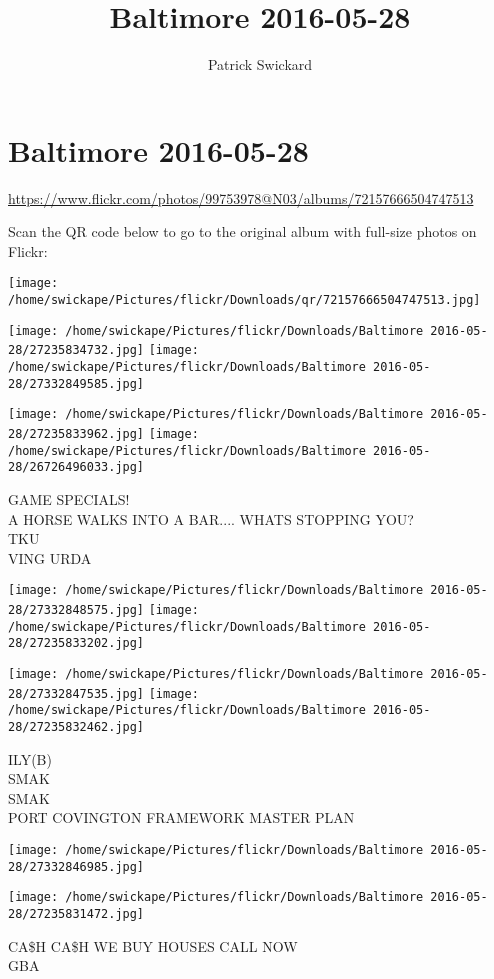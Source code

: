 \documentclass[10pt,letterpaper]{article}
\title{Baltimore 2016-05-28}
\author{Patrick Swickard}
\date{}
\begin{document}
\section*{Baltimore 2016-05-28}

\url{https://www.flickr.com/photos/99753978@N03/albums/72157666504747513}

Scan the QR code below to go to the original album with full-size photos on Flickr:

\texttt{[image: /home/swickape/Pictures/flickr/Downloads/qr/72157666504747513.jpg]}
\pagebreak

\texttt{[image: /home/swickape/Pictures/flickr/Downloads/Baltimore 2016-05-28/27235834732.jpg]}
\texttt{[image: /home/swickape/Pictures/flickr/Downloads/Baltimore 2016-05-28/27332849585.jpg]}

\texttt{[image: /home/swickape/Pictures/flickr/Downloads/Baltimore 2016-05-28/27235833962.jpg]}
\texttt{[image: /home/swickape/Pictures/flickr/Downloads/Baltimore 2016-05-28/26726496033.jpg]}

GAME SPECIALS!\\
A HORSE WALKS INTO A BAR.... WHATS STOPPING YOU?\\
TKU\\
VING URDA
\pagebreak

\texttt{[image: /home/swickape/Pictures/flickr/Downloads/Baltimore 2016-05-28/27332848575.jpg]}
\texttt{[image: /home/swickape/Pictures/flickr/Downloads/Baltimore 2016-05-28/27235833202.jpg]}

\texttt{[image: /home/swickape/Pictures/flickr/Downloads/Baltimore 2016-05-28/27332847535.jpg]}
\texttt{[image: /home/swickape/Pictures/flickr/Downloads/Baltimore 2016-05-28/27235832462.jpg]}

ILY(B)\\
SMAK\\
SMAK\\
PORT COVINGTON FRAMEWORK MASTER PLAN
\pagebreak

\texttt{[image: /home/swickape/Pictures/flickr/Downloads/Baltimore 2016-05-28/27332846985.jpg]}

\vspace{0.25in}
\texttt{[image: /home/swickape/Pictures/flickr/Downloads/Baltimore 2016-05-28/27235831472.jpg]}

CA\$H CA\$H WE BUY HOUSES CALL NOW\\
GBA
\pagebreak
\end{document}
